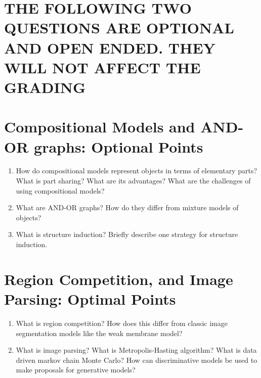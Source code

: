 \documentclass[10pt,onecolumn,letterpaper]{article}
\begin{document}
\section*{THE FOLLOWING TWO QUESTIONS ARE OPTIONAL AND OPEN ENDED. THEY WILL NOT AFFECT THE GRADING}

\section*{Compositional Models and AND-OR graphs: Optional Points}

\begin{enumerate}

\item How do compositional models represent objects in terms of elementary parts? What is part sharing? What are its advantages? What are the challenges of using compositional models?

\item What are AND-OR graphs? How do they differ from mixture models of objects?

\item What is structure induction? Briefly describe one strategy for structure induction.

\end{enumerate}

\section*{Region Competition, and Image Parsing: Optimal Points}

\begin{enumerate}


\item What is region competition? How does this differ from classic image segmentation models like the weak membrane model?

\item What is image parsing? What is Metropolis-Hasting algorithm? What is data driven markov chain Monte Carlo? How can discriminative models be used to make proposals for generative models?

\end{enumerate}
\end{document}
